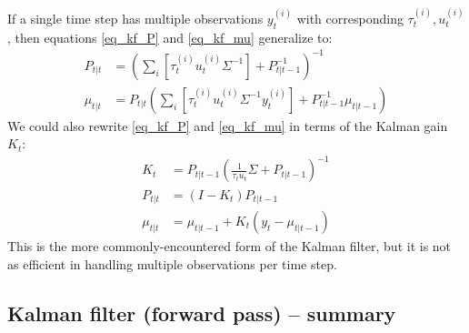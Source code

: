 \documentclass[11pt]{article}
\begin{document}
If a single time step has multiple observations $y_t^{(i)}$ with corresponding $\tau_t^{(i)}, u_t^{(i)}$, then equations \eqref{eq_kf_P} and \eqref{eq_kf_mu} generalize to:
\begin{align*}
	P_{t|t} &= \left( \sum_{i} \left[ \tau_t^{(i)} u_t^{(i)} \Sigma^{-1} \right] + P_{t|t-1}^{-1} \right)^{-1} \\
	\mu_{t|t} &= P_{t|t} \left( \sum_{i} \left[ \tau_t^{(i)} u_t^{(i)} \Sigma^{-1} y_t^{(i)}\right] + P_{t|t-1}^{-1}\mu_{t|t-1} \right)
\end{align*}
We could also rewrite \eqref{eq_kf_P} and \eqref{eq_kf_mu} in terms of the Kalman gain $K_t$:
\begin{align*}
	K_t &= P_{t|t-1}\left(\frac{1}{\tau_t u_t} \Sigma + P_{t|t-1}\right)^{-1} \\
	P_{t|t} &= (I - K_t) P_{t|t-1} \\
	\mu_{t|t} &= \mu_{t|t-1} + K_t( y_t - \mu_{t|t-1}) 
\end{align*}
This is the more commonly-encountered form of the Kalman filter, but it is not as efficient in handling multiple observations per time step.

\subsection{Kalman filter (forward pass) -- summary}
\end{document}
